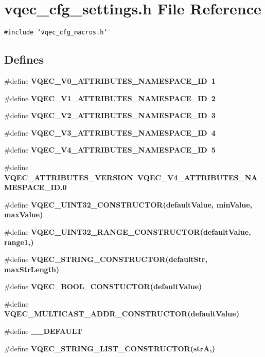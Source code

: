 \section{vqec\_\-cfg\_\-settings.h File Reference}
\label{vqec__cfg__settings_8h}
{\tt \#include \char`\"{}vqec\_\-cfg\_\-macros.h\char`\"{}}\par
\subsection*{Defines}
\begin{CompactItemize}
\item 
\#define \bf{VQEC\_\-V0\_\-ATTRIBUTES\_\-NAMESPACE\_\-ID}~1
\item 
\#define \bf{VQEC\_\-V1\_\-ATTRIBUTES\_\-NAMESPACE\_\-ID}~2
\item 
\#define \bf{VQEC\_\-V2\_\-ATTRIBUTES\_\-NAMESPACE\_\-ID}~3
\item 
\#define \bf{VQEC\_\-V3\_\-ATTRIBUTES\_\-NAMESPACE\_\-ID}~4
\item 
\#define \bf{VQEC\_\-V4\_\-ATTRIBUTES\_\-NAMESPACE\_\-ID}~5
\item 
\#define \bf{VQEC\_\-ATTRIBUTES\_\-VERSION}~VQEC\_\-V4\_\-ATTRIBUTES\_\-NAMESPACE\_\-ID.0
\item 
\#define \bf{VQEC\_\-UINT32\_\-CONSTRUCTOR}(default\-Value, min\-Value, max\-Value)
\item 
\#define \bf{VQEC\_\-UINT32\_\-RANGE\_\-CONSTRUCTOR}(default\-Value, range1,)
\item 
\#define \bf{VQEC\_\-STRING\_\-CONSTRUCTOR}(default\-Str, max\-Str\-Length)
\item 
\#define \bf{VQEC\_\-BOOL\_\-CONSTUCTOR}(default\-Value)
\item 
\#define \bf{VQEC\_\-MULTICAST\_\-ADDR\_\-CONSTRUCTOR}(default\-Value)
\item 
\#define \bf{\_\-\_\-DEFAULT}
\item 
\#define \bf{VQEC\_\-STRING\_\-LIST\_\-CONSTRUCTOR}(str\-A,)
\end{CompactItemize}
